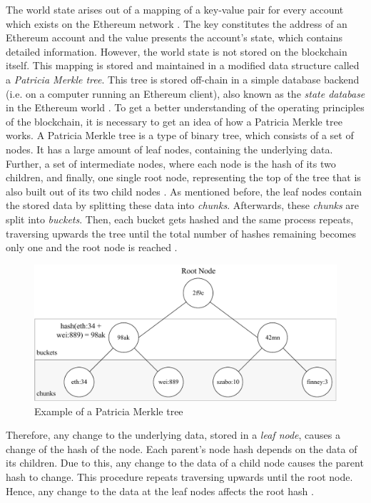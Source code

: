 The world state arises out of a mapping of a key-value pair for every account which exists 
on the Ethereum network . 
The key constitutes the address of an Ethereum account and the value presents 
the account's state, which contains detailed information. 
However, the world state is not stored on the blockchain itself. 
This mapping is stored and maintained in a modified data structure 
called a \textit{Patricia Merkle tree}. This tree is stored off-chain 
in a simple database backend (i.e. on a computer running an Ethereum client), 
also known as the \textit{state database} in the Ethereum world . 
To get a better understanding of the operating principles of the blockchain, 
it is necessary to get an idea of how a Patricia Merkle tree works. 
A Patricia Merkle tree is a type of binary tree, which consists 
of a set of nodes. It has a large amount of 
leaf nodes, containing the underlying data. 
Further, a set of intermediate nodes, where each node is 
the hash of its two children, and finally, one single root node, 
representing the top of the tree that is also built out of its 
two child nodes  .
As mentioned before, the leaf nodes contain the stored data 
by splitting these data into \textit{chunks}. Afterwards, these \textit{chunks} are split into \textit{buckets}. 
Then, each bucket gets hashed and the same process repeats, traversing 
upwards the tree until the total number of hashes remaining becomes 
only one and the root node is reached . 

\begin{figure}[htbp]
	\centering
	\includegraphics[width=.8\linewidth]{./figures/merkle_tree.pdf}
	\caption{Example of a Patricia Merkle tree}
	\label{figure:merkle_tree}
\end{figure}

Therefore, any change to the underlying data, stored in a \textit{leaf node}, causes a change
of the hash of the node. Each parent's node hash depends on the data of its children. 
Due to this, any change to the data of a child node causes the parent hash to change. 
This procedure repeats traversing upwards until the root node. 
Hence, any change to the data at the leaf nodes affects the root hash . 

